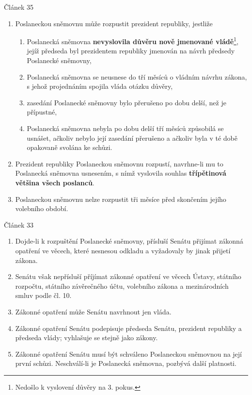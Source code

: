 \documentclass[10pt,a4paper,
twoside,%
]{report}
\newcommand{\ust}[1]{\begin{footnotesize}%
\begin{center}
Článek #1
\end{center}
\end{footnotesize}}%
\begin{document}
\begin{footnotesize}
\ust{35}{\begin{enumerate}

\item Poslaneckou sněmovnu může rozpustit prezident republiky, jestliže \begin{enumerate}

\item Poslanecká sněmovna \textbf{nevyslovila důvěru nově jmenované vládě}\footnote{Nedošlo k vyslovení důvěry na 3. pokus.}, jejíž předseda byl prezidentem republiky jmenován na návrh předsedy Poslanecké sněmovny,
\item Poslanecká sněmovna se neusnese do tří měsíců o vládním návrhu zákona, s jehož projednáním spojila vláda otázku důvěry,
\item zasedání Poslanecké sněmovny bylo přerušeno po dobu delší, než je přípustné,
\item Poslanecká sněmovna nebyla po dobu delší tří měsíců způsobilá se usnášet, ačkoliv nebylo její zasedání přerušeno a ačkoliv byla v té době opakovaně svolána ke schůzi. 
\end{enumerate}
\item Prezident republiky Poslaneckou sněmovnu rozpustí, navrhne-li mu to Poslanecká sněmovna usnesením, s nímž vyslovila souhlas \textbf{třípětinová většina všech poslanců}. 
\item Poslaneckou sněmovnu nelze rozpustit tři měsíce před skončením jejího volebního období.
\end{enumerate}}

\ust{33}\begin{enumerate}

\item Dojde-li k rozpuštění Poslanecké sněmovny, přísluší Senátu přijímat zákonná opatření ve věcech, které nesnesou odkladu a vyžadovaly by jinak přijetí zákona.
\item Senátu však nepřísluší příjímat zákonné opatření ve věcech Ústavy, státního rozpočtu, státního závěrečného účtu, volebního zákona a mezinárodních smluv podle čl. 10.
\item Zákonné opatření může Senátu navrhnout jen vláda.
\item Zákonné opatření Senátu podepisuje předseda Senátu, prezident republiky a předseda vlády; vyhlašuje se stejně jako zákony.
\item Zákonné opatření Senátu musí být schváleno Poslaneckou sněmovnou na její první schůzi. Neschválí-li je Poslanecká sněmovna, pozbývá další platnosti.
\end{enumerate}
\end{footnotesize}
\end{document}
